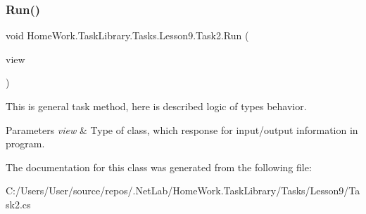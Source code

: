 \subsubsection{\texorpdfstring{Run()}{Run()}}
{\footnotesize\ttfamily void Home\+Work.\+Task\+Library.\+Tasks.\+Lesson9.\+Task2.\+Run (\begin{DoxyParamCaption}\item[{I\+Information}]{view }\end{DoxyParamCaption})}



This is general task method, here is described logic of types behavior. 


\begin{DoxyParams}{Parameters}
{\em view} & Type of class, which response for input/output information in program.\\
\hline
\end{DoxyParams}


The documentation for this class was generated from the following file\+:\begin{DoxyCompactItemize}
\item 
C\+:/\+Users/\+User/source/repos/.\+Net\+Lab/\+Home\+Work.\+Task\+Library/\+Tasks/\+Lesson9/Task2.\+cs\end{DoxyCompactItemize}
